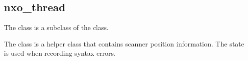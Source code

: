 %
%
%
%
%              

\subsection{nxo\_thread}
\label{nxo_thread}

The  class is a subclass of the  class.

The  class is a helper class that contains scanner position
information.  The  state is used when recording syntax
errors.

